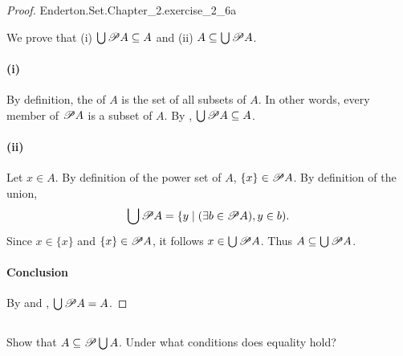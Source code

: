 \documentclass{report}
\begin{document}
\begin{proof}

    {Enderton.Set.Chapter\_2.exercise\_2\_6a}

  We prove that (i) $\bigcup \mathscr{P}A \subseteq A$ and (ii)
    $A \subseteq \bigcup \mathscr{P}A$.

  \paragraph{(i)}%

    By definition, the  of $A$ is the set of all subsets
      of $A$.
    In other words, every member of $\mathscr{P}A$ is a subset of $A$.
    By , $\bigcup \mathscr{P}A \subseteq A$.

  \paragraph{(ii)}%

    Let $x \in A$.
    By definition of the power set of $A$, $\{x\} \in \mathscr{P}A$. 
    By definition of the union,
      $$\bigcup \mathscr{P}A =
        \{ y \mid (\exists b \in \mathscr{P}A), y \in b).$$
    Since $x \in \{x\}$ and $\{x\} \in \mathscr{P}A$, it follows
      $x \in \bigcup \mathscr{P}A$.
    Thus $A \subseteq \bigcup \mathscr{P}A$.

  \paragraph{Conclusion}%

    By  and ,
      $\bigcup \mathscr{P}A = A$.

\end{proof}

\subsection{}%

Show that $A \subseteq \mathscr{P}\bigcup A$.
Under what conditions does equality hold?
\end{document}
